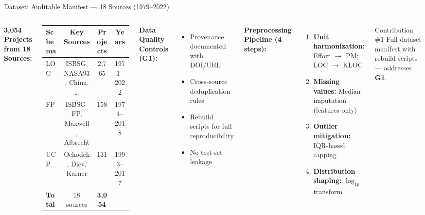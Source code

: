 \documentclass[aspectratio=169]{beamer}
\begin{document}
\begin{frame}{Dataset: Auditable Manifest --- 18 Sources (1979--2022)}
\begin{columns}[T]
\textbf{3,054 Projects from 18 Sources:}
\vspace{0.1cm}
\begin{table}
\tiny
\begin{tabular}{lccc}
\toprule
\textbf{Schema} & \textbf{Key Sources} & \textbf{Projects} & \textbf{Years} \\
\midrule
LOC & ISBSG, NASA93, China, \ldots & 2,765 & 1971--2022 \\
FP  & ISBSG-FP, Maxwell, Albrecht  & 158   & 1974--2018 \\
UCP & Ochodek, Diev, Karner        & 131   & 1993--2017 \\
\midrule
\textbf{Total} & 18 sources & \textbf{3,054} & \\
\bottomrule
\end{tabular}
\end{table}

\vspace{0.1cm}
\textbf{Data Quality Controls (G1):}
\begin{itemize}\small
    \item Provenance documented with DOI/URL
    \item Cross-source deduplication rules
    \item Rebuild scripts for full reproducibility
    \item No test-set leakage
\end{itemize}

\textbf{Preprocessing Pipeline (4 steps):}
\begin{enumerate}\small
    \item \textbf{Unit harmonization:} Effort $\to$ PM; LOC $\to$ KLOC
    \item \textbf{Missing values:} Median imputation (features only)
    \item \textbf{Outlier mitigation:} IQR-based capping
    \item \textbf{Distribution shaping:} $\log_{1p}$ transform
\end{enumerate}

\vspace{0.1cm}
\begin{alertblock}{Contribution \#1}
\small Full dataset manifest with rebuild scripts --- addresses \textbf{G1}.
\end{alertblock}
\end{columns}
\end{frame}
\end{document}
